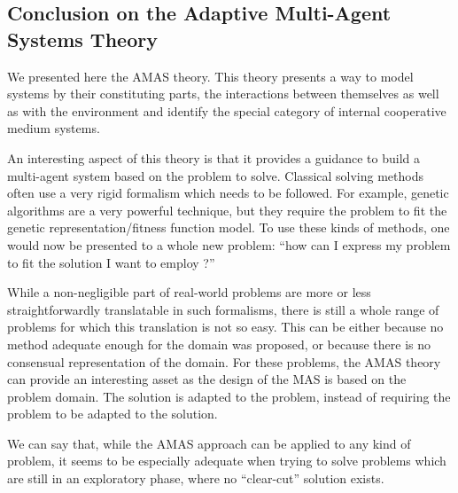 \subsection{Conclusion on the Adaptive Multi-Agent Systems Theory}

We presented here the AMAS theory. This theory presents a way to model systems by their constituting parts, the interactions between themselves as well as with the environment and identify the special category of internal cooperative medium systems.

An interesting aspect of this theory is that it provides a guidance to build a multi-agent system based on the problem to solve. Classical solving methods often use a very rigid formalism which needs to be followed. For example, genetic algorithms are a very powerful technique, but they require the problem to fit the genetic representation/fitness function model. To use these kinds of methods, one would now be presented to a whole new problem: \enquote{how can I express my problem to fit the solution I want to employ ?}

While a non-negligible part of real-world problems are more or less straightforwardly translatable in such formalisms, there is still a whole range of problems for which this translation is not so easy. This can be either because no method adequate enough for the domain was proposed, or because there is no consensual representation of the domain. For these problems, the AMAS theory can provide an interesting asset as the design of the MAS is based on the problem domain. The solution is adapted to the problem, instead of requiring the problem to be adapted to the solution.

We can say that, while the AMAS approach can be applied to any kind of problem, it seems to be especially adequate when trying to solve problems which are still in an exploratory phase, where no \enquote{clear-cut} solution exists.



